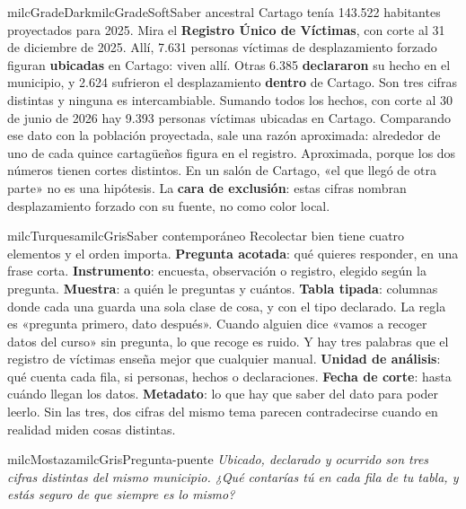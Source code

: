 \documentclass[11pt,letterpaper]{article}
\begin{document}
\begin{softbox}{milcGradeDark}{milcGradeSoft}{Saber ancestral}
Cartago tenía 143.522 habitantes proyectados para 2025. Mira el \textbf{Registro Único de Víctimas}, con corte al 31 de diciembre de 2025. Allí, 7.631 personas víctimas de desplazamiento forzado figuran \textbf{ubicadas} en Cartago: viven allí. Otras 6.385 \textbf{declararon} su hecho en el municipio, y 2.624 sufrieron el desplazamiento \textbf{dentro} de Cartago. Son tres cifras distintas y ninguna es intercambiable. Sumando todos los hechos, con corte al 30 de junio de 2026 hay 9.393 personas víctimas ubicadas en Cartago. Comparando ese dato con la población proyectada, sale una razón aproximada: alrededor de uno de cada quince cartagüeños figura en el registro. Aproximada, porque los dos números tienen cortes distintos. En un salón de Cartago, «el que llegó de otra parte» no es una hipótesis. La \textbf{cara de exclusión}: estas cifras nombran desplazamiento forzado con su fuente, no como color local.\par{}
\end{softbox}

\begin{softbox}{milcTurquesa}{milcGris}{Saber contemporáneo}
Recolectar bien tiene cuatro elementos y el orden importa. \textbf{Pregunta acotada}: qué quieres responder, en una frase corta. \textbf{Instrumento}: encuesta, observación o registro, elegido según la pregunta. \textbf{Muestra}: a quién le preguntas y cuántos. \textbf{Tabla tipada}: columnas donde cada una guarda una sola clase de cosa, y con el tipo declarado. La regla es «pregunta primero, dato después». Cuando alguien dice «vamos a recoger datos del curso» sin pregunta, lo que recoge es ruido. Y hay tres palabras que el registro de víctimas enseña mejor que cualquier manual. \textbf{Unidad de análisis}: qué cuenta cada fila, si personas, hechos o declaraciones. \textbf{Fecha de corte}: hasta cuándo llegan los datos. \textbf{Metadato}: lo que hay que saber del dato para poder leerlo. Sin las tres, dos cifras del mismo tema parecen contradecirse cuando en realidad miden cosas distintas.
\end{softbox}

\begin{softbox}{milcMostaza}{milcGris}{Pregunta-puente}
\textit{Ubicado, declarado y ocurrido son tres cifras distintas del mismo municipio. ¿Qué contarías tú en cada fila de tu tabla, y estás seguro de que siempre es lo mismo?}
\end{softbox}
\end{document}
